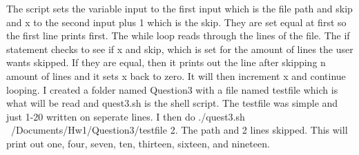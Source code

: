 \documentclass{article}
\begin{document}
\begin{enumerate}
  The script sets the variable input to the first input which is the file path and skip and x to the second input plus 1 which is the skip. They are set equal at first so the first line prints first. The while loop reads through the lines of the file. The if statement checks to see if x and skip, which is set for the amount of lines the user wants skipped. If they are equal, then it prints out the line after skipping n amount of lines and it sets x back to zero. It will then increment x and continue looping. I created a folder named Question3 with a file named testfile which is what will be read and quest3.sh is the shell script. The testfile was simple and just 1-20 written on seperate lines. I then do ./quest3.sh ~/Documents/Hw1/Question3/testfile 2. The path and 2 lines skipped. This will print out one, four, seven, ten, thirteen, sixteen, and nineteen.
  
\end{enumerate}
\end{document}
